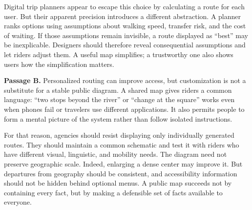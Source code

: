 Digital trip planners appear to escape this choice by calculating a route for
each user. But their apparent precision introduces a different abstraction. A
planner ranks options using assumptions about walking speed, transfer risk, and
the cost of waiting. If those assumptions remain invisible, a route displayed as
``best'' may be inexplicable. Designers should therefore reveal consequential
assumptions and let riders adjust them. A useful map simplifies; a trustworthy
one also shows users how the simplification matters.

\textbf{Passage B.} Personalized routing can improve access, but customization is
not a substitute for a stable public diagram. A shared map gives riders a common
language: ``two stops beyond the river'' or ``change at the square'' works even
when phones fail or travelers use different applications. It also permits people
to form a mental picture of the system rather than follow isolated instructions.

For that reason, agencies should resist displaying only individually generated
routes. They should maintain a common schematic and test it with riders who have
different visual, linguistic, and mobility needs. The diagram need not preserve
geographic scale. Indeed, enlarging a dense center may improve it. But departures
from geography should be consistent, and accessibility information should not be
hidden behind optional menus. A public map succeeds not by containing every fact,
but by making a defensible set of facts available to everyone.

